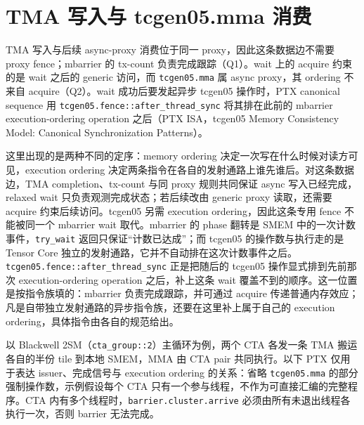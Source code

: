 \section{TMA 写入与 tcgen05.mma 消费}

TMA 写入与后续 async-proxy 消费位于同一 proxy，因此这条数据边不需要 proxy fence；mbarrier 的 tx-count 负责完成跟踪（Q1）。wait 上的 acquire 约束的是 wait 之后的 generic 访问，而 \lstinline|tcgen05.mma| 属 async proxy，其 ordering 不来自 acquire（Q2）。wait 成功后要发起异步 tcgen05 操作时，PTX canonical sequence 用 \lstinline|tcgen05.fence::after_thread_sync| 将其排在此前的 mbarrier execution-ordering operation 之后（PTX ISA，tcgen05 Memory Consistency Model: Canonical Synchronization Patterns）。

这里出现的是两种不同的定序：memory ordering 决定一次写在什么时候对读方可见，execution ordering 决定两条指令在各自的发射通路上谁先谁后。对这条数据边，TMA completion、tx-count 与同 proxy 规则共同保证 async 写入已经完成，relaxed wait 只负责观测完成状态；若后续改由 generic proxy 读取，还需要 acquire 约束后续访问。tcgen05 另需 execution ordering，因此这条专用 fence 不能被同一个 mbarrier wait 取代。mbarrier 的 phase 翻转是 SMEM 中的一次计数事件，\lstinline|try_wait| 返回只保证“计数已达成”；而 tcgen05 的操作数与执行走的是 Tensor Core 独立的发射通路，它并不自动排在这次计数事件之后。\lstinline|tcgen05.fence::after_thread_sync| 正是把随后的 tcgen05 操作显式排到先前那次 execution-ordering operation 之后，补上这条 wait 覆盖不到的顺序。这一位置是按指令族填的：mbarrier 负责完成跟踪，并可通过 acquire 传递普通内存效应；凡是自带独立发射通路的异步指令族，还要在这里补上属于自己的 execution ordering，具体指令由各自的规范给出。

以 Blackwell 2SM（\lstinline|cta_group::2|）主循环为例，两个 CTA 各发一条 TMA 搬运各自的半份 tile 到本地 SMEM，MMA 由 CTA pair 共同执行。以下 PTX 仅用于表达 issuer、完成信号与 execution ordering 的关系：省略 \lstinline|tcgen05.mma| 的部分强制操作数，示例假设每个 CTA 只有一个参与线程，不作为可直接汇编的完整程序。CTA 内有多个线程时，\lstinline|barrier.cluster.arrive| 必须由所有未退出线程各执行一次，否则 barrier 无法完成。

